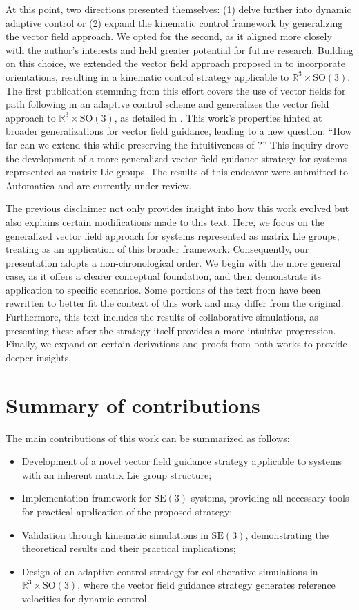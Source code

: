 At this point, two directions presented themselves: (1) delve further into dynamic adaptive control or (2) expand the kinematic control framework by generalizing the vector field approach. We opted for the second, as it aligned more closely with the author's interests and held greater potential for future research. Building on this choice, we extended the vector field approach proposed in \citet{Rezende2022} to incorporate orientations, resulting in a kinematic control strategy applicable to $\mathbb{R}^3\times\text{SO}(3)$. The first publication stemming from this effort covers the use of vector fields for path following in an adaptive control scheme and generalizes the vector field approach to $\mathbb{R}^3\times\text{SO}(3)$, as detailed in \citet{Pessoa2024}. This work's properties hinted at broader generalizations for vector field guidance, leading to a new question: ``How far can we extend this while preserving the intuitiveness of \citet{Rezende2022}?'' This inquiry drove the development of a more generalized vector field guidance strategy for systems represented as matrix Lie groups. The results of this endeavor were submitted to Automatica and are currently under review.

The previous disclaimer not only provides insight into how this work evolved but also explains certain modifications made to this text. Here, we focus on the generalized vector field approach for systems represented as matrix Lie groups, treating \citet{Pessoa2024} as an application of this broader framework. Consequently, our presentation adopts a non-chronological order. We begin with the more general case, as it offers a clearer conceptual foundation, and then demonstrate its application to specific scenarios. Some portions of the text from \citet{Pessoa2024} have been rewritten to better fit the context of this work and may differ from the original. Furthermore, this text includes the results of collaborative simulations, as presenting these after the strategy itself provides a more intuitive progression. Finally, we expand on certain derivations and proofs from both works to provide deeper insights.
\section{Summary of contributions}
The main contributions of this work can be summarized as follows:
\begin{itemize}
    \item Development of a novel vector field guidance strategy applicable to systems with an inherent matrix Lie group structure;
    \item Implementation framework for $\text{SE}(3)$ systems, providing all necessary tools for practical application of the proposed strategy;
    \item Validation through kinematic simulations in $\text{SE}(3)$, demonstrating the theoretical results and their practical implications;
    \item Design of an adaptive control strategy for collaborative simulations in $\mathbb{R}^3 \times \text{SO}(3)$, where the vector field guidance strategy generates reference velocities for dynamic control.
\end{itemize}

